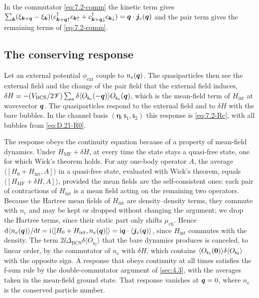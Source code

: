 In the commutator \cref{eq:7.2-comm} the kinetic term gives $\sum_{\bm{k}}(\xi_{\bm{k}+\bm{q}} - \xi_{\bm{k}})(c^\dagger_{\bm{k}+\bm{q}\uparrow}c_{\bm{k}\uparrow} + c^\dagger_{\bm{k}+\bm{q}\downarrow}c_{\bm{k}\downarrow}) = \bm{q}\cdot\bm{j}_e(\bm{q})$ and the pair term gives the remaining terms of \cref{eq:7.2-comm}.

\subsection*{The conserving response}

Let an external potential $\phi_{\mathrm{ext}}$ couple to $n_e(\bm{q})$. The quasiparticles then see the external field and the change of the pair field that the external field induces, $\delta H = -(V_{\mathrm{BCS}}/2\mathscr{V})\sum_a\delta\langle O_{\mathsf{s}_a}(-\bm{q})\rangle O_{\mathsf{s}_a}(\bm{q})$, which is the mean-field term of $H_{\mathrm{int}}$ at wavevector $\bm{q}$. The quasiparticles respond to the external field and to $\delta H$ with the bare bubbles. In the channel basis $(\boldsymbol{\eta}, \mathsf{s}_1, \mathsf{s}_2)$ this response is \cref{eq:7.2-Rc}, with all bubbles from \cref{eq:D.21-R0}.

The response obeys the continuity equation because of a property of mean-field dynamics. Under $H_{\mathrm{MF}} + \delta H$, at every time the state stays a quasi-free state, one for which Wick's theorem holds. For any one-body operator $A$, the average $\langle[H_0 + H_{\mathrm{int}}, A]\rangle$ in a quasi-free state, evaluated with Wick's theorem, equals $\langle[H_{\mathrm{MF}} + \delta H, A]\rangle$, provided the mean fields are the self-consistent ones: each pair of contractions of $H_{\mathrm{int}}$ is a mean field acting on the remaining two operators. Because the Hartree mean fields of $H_{\mathrm{int}}$ are density--density terms, they commute with $n_e$ and may be kept or dropped without changing the argument; we drop the Hartree terms, since their static part only shifts $\mu_{\mathrm{ch}}$. Hence $\mathrm{d}\langle n_e(\bm{q})\rangle/\mathrm{d} t = \mathrm{i}\langle[H_0 + H_{\mathrm{int}}, n_e(\bm{q})]\rangle = \mathrm{i}\bm{q}\cdot\langle\bm{j}_e(\bm{q})\rangle$, since $H_{\mathrm{int}}$ commutes with the density. The term $2\ii\Delta_{\mathrm{BCS}}\delta\langle O_{\mathsf{s}_2}\rangle$ that the bare dynamics produces is canceled, to linear order, by the commutator of $n_e$ with $\delta H$, which contains $\langle O_{\mathsf{s}_1}(\bm{0})\rangle\delta\langle O_{\mathsf{s}_2}\rangle$ with the opposite sign. A response that obeys continuity at all times satisfies the f-sum rule by the double-commutator argument of \cref{sec:4.3}, with the averages taken in the mean-field ground state. That response vanishes at $\bm{q} = 0$, where $n_e$ is the conserved particle number.
